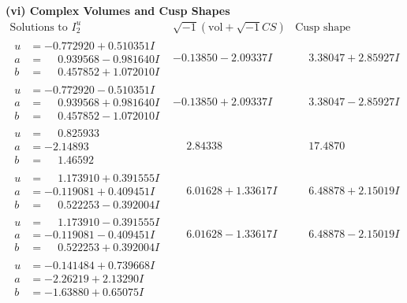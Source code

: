 \documentclass[1p]{elsarticle_modified}
\theoremstyle{definition}
\newcommand{\I}{\sqrt{-1}}
\begin{document}
\newpage\flushleft \textbf{(vi) Complex Volumes and Cusp Shapes}
$$\begin{array}{c|c|c}  
\text{Solutions to }I^u_{2}& \I (\text{vol} + \sqrt{-1}CS) & \text{Cusp shape}\\
 \hline 
\begin{aligned}
u &= -0.772920 + 0.510351 I \\
a &= \phantom{-}0.939568 - 0.981640 I \\
b &= \phantom{-}0.457852 + 1.072010 I\end{aligned}
 & -0.13850 - 2.09337 I & \phantom{-}3.38047 + 2.85927 I \\ \hline\begin{aligned}
u &= -0.772920 - 0.510351 I \\
a &= \phantom{-}0.939568 + 0.981640 I \\
b &= \phantom{-}0.457852 - 1.072010 I\end{aligned}
 & -0.13850 + 2.09337 I & \phantom{-}3.38047 - 2.85927 I \\ \hline\begin{aligned}
u &= \phantom{-}0.825933\phantom{ +0.000000I} \\
a &= -2.14893\phantom{ +0.000000I} \\
b &= \phantom{-}1.46592\phantom{ +0.000000I}\end{aligned}
 & \phantom{-}2.84338\phantom{ +0.000000I} & \phantom{-}17.4870\phantom{ +0.000000I} \\ \hline\begin{aligned}
u &= \phantom{-}1.173910 + 0.391555 I \\
a &= -0.119081 + 0.409451 I \\
b &= \phantom{-}0.522253 - 0.392004 I\end{aligned}
 & \phantom{-}6.01628 + 1.33617 I & \phantom{-}6.48878 + 2.15019 I \\ \hline\begin{aligned}
u &= \phantom{-}1.173910 - 0.391555 I \\
a &= -0.119081 - 0.409451 I \\
b &= \phantom{-}0.522253 + 0.392004 I\end{aligned}
 & \phantom{-}6.01628 - 1.33617 I & \phantom{-}6.48878 - 2.15019 I \\ \hline\begin{aligned}
u &= -0.141484 + 0.739668 I \\
a &= -2.26219 + 2.13290 I \\
b &= -1.63880 + 0.65075 I\end{aligned}

\end{array}$$
\end{document}
